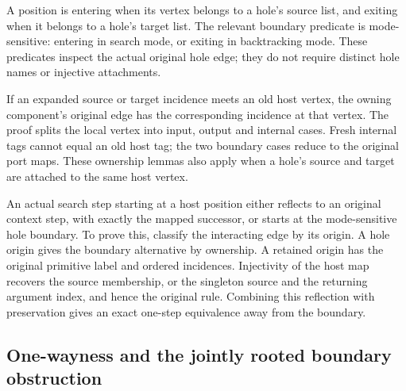 
A position is entering when its vertex belongs to a hole's source list,
and exiting when it belongs to a hole's target list. The relevant boundary
predicate is mode-sensitive: entering in search mode, or exiting in
backtracking mode. These predicates inspect the actual original hole edge;
they do not require distinct hole names or injective attachments.




If an expanded source or target incidence meets an old host vertex, the
owning component's original edge has the corresponding incidence at that
vertex. The proof splits the local vertex into input, output and internal
cases. Fresh internal tags cannot equal an old host tag; the two boundary
cases reduce to the original port maps. These ownership lemmas also apply
when a hole's source and target are attached to the same host vertex.



An actual search step starting at a host position either reflects to an
original context step, with exactly the mapped successor, or starts at the
mode-sensitive hole boundary. To prove this, classify the interacting edge
by its origin. A hole origin gives the boundary alternative by ownership.
A retained origin has the original primitive label and ordered incidences.
Injectivity of the host map recovers the source membership, or the singleton
source and the returning argument index, and hence the original rule.
Combining this reflection with preservation gives an exact one-step
equivalence away from the boundary.



\subsection{One-wayness and the jointly rooted boundary obstruction}

